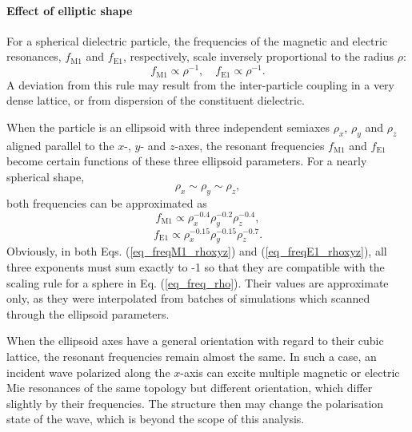 
\paragraph{Effect of elliptic shape}%
For a spherical dielectric particle, the frequencies of the magnetic and electric resonances, $f_{\text{M1}}$ and $f_{\text{E1}}$, respectively, scale inversely proportional to the radius $\rho$:
\begin{equation} f_{\text{M1}} \propto \rho^{-1}, \quad f_{\text{E1}} \propto \rho^{-1}. \label{eq_freq_rho}\end{equation}
A deviation from this rule may result from the inter-particle coupling in a very dense lattice, or from dispersion of the constituent dielectric.

When the particle is an ellipsoid with three independent semiaxes $\rho_x$, $\rho_y$ and $\rho_z$ aligned parallel to the $x$-, $y$- and $z$-axes, the resonant frequencies $f_{\text{M1}}$ and $f_{\text{E1}}$ become certain functions of these three ellipsoid parameters. For a nearly spherical shape, 
$$\rho_x \sim \rho_y \sim \rho_z,$$
both frequencies can be approximated as 
\begin{equation}  f_{\text{M1}} \propto \rho_x^{-0.4}  \rho_y^{-0.2} \rho_z^{-0.4}, \label{eq_freqM1_rhoxyz}\end{equation}
\begin{equation}  f_{\text{E1}} \propto \rho_x^{-0.15}  \rho_y^{-0.15} \rho_z^{-0.7}. \label{eq_freqE1_rhoxyz}\end{equation}
Obviously,  in both Eqs. (\ref{eq_freqM1_rhoxyz}) and (\ref{eq_freqE1_rhoxyz}), all three exponents must sum exactly to -1 so that they are compatible with the scaling rule for a sphere in Eq. (\ref{eq_freq_rho}). Their values are approximate only, as they were interpolated from batches of simulations which scanned through the ellipsoid parameters.

When the ellipsoid axes have a general orientation with regard to their cubic lattice, the resonant frequencies remain almost the same. In such a case, an incident wave polarized along the $x$-axis can  excite multiple magnetic or electric Mie resonances of the same topology but different orientation, which differ slightly by their frequencies. The structure then may change the polarisation state of the wave, which is beyond the scope of this analysis.

